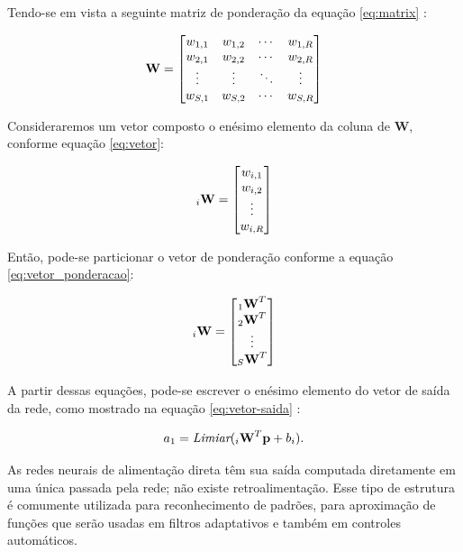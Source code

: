 \documentclass[
	12pt,				%
    oneside,			%
	a4paper,			%
	english,			%
	french,				%
	spanish,			%
	brazil,				%
	]{abntex2}
\begin{document}
Tendo-se em vista a seguinte matriz de ponderação da equação \ref{eq:matrix} :

\begin{equation}
\centering
\textbf{W} ={\begin{bmatrix}
    w_{1,1} & w_{1,2} & \cdots & w_{1,R}\\
    w_{2,1} & w_{2,2} & \cdots & w_{2,R}\\
    \vdots & \vdots & \ddots & \vdots \\
    w_{S,1} & w_{S,2} & \cdots & w_{S,R}
\end{bmatrix}}
\label{eq:matrix}
\end{equation} 

Consideraremos um vetor composto o enésimo elemento da coluna de \textbf{W}, conforme equação \ref{eq:vetor}:

\begin{equation}
\centering
\textbf{$_i$W} ={\begin{bmatrix}
    w_{i,1}\\
    w_{i,2}\\
    \vdots \\
    w_{i,R}
\end{bmatrix}}
\label{eq:vetor}
\end{equation}

Então, pode-se particionar o vetor de ponderação conforme a equação \ref{eq:vetor_ponderacao}:

\begin{equation}
\centering
\textbf{$_i$W} ={\begin{bmatrix}
    \textbf{$_1$W}^T\\
    \textbf{$_2$W}^T\\
    \vdots \\
    \textbf{$_S$W}^T
\end{bmatrix}}
\label{eq:vetor_ponderacao}
\end{equation}

A partir dessas equações, pode-se escrever o enésimo elemento do vetor de saída da rede, como mostrado na equação \ref{eq:vetor-saida} :

\begin{equation}
\centering
    a_1=\textit{Limiar}(\textbf{$_i$W}^T\textbf{p}+\textit{$b_i$}).
    \label{eq:vetor-saida}
\end{equation}

As redes neurais de alimentação direta têm sua saída computada diretamente em uma única passada pela rede; não existe retroalimentação. Esse tipo de estrutura é comumente utilizada para reconhecimento de padrões, para aproximação de funções que serão usadas em filtros adaptativos e também em controles automáticos.
\end{document}
